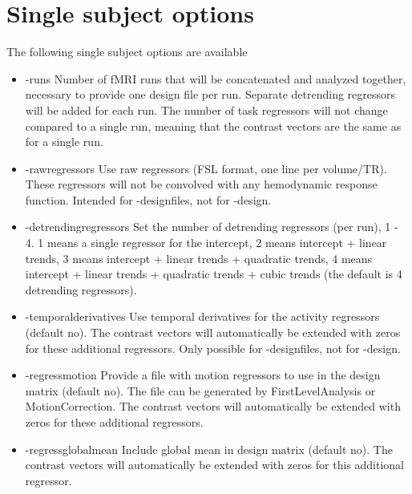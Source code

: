 \section{Single subject options}

The following single subject options are available

\begin{itemize}

\item -runs
\newline \newline Number of fMRI runs that will be concatenated and analyzed together, necessary to provide one design file per run. Separate detrending regressors will be added for each run. The number of task regressors will not change compared to a single run, meaning that the contrast vectors are the same as for a single run.

\item -rawregressors
\newline \newline Use raw regressors (FSL format, one line per volume/TR). These regressors will not be convolved with any hemodynamic response function. Intended for -designfiles, not for -design.

\item -detrendingregressors
\newline \newline Set the number of detrending regressors (per run), 1 - 4. 1 means a single regressor for the intercept, 2 means intercept + linear trends, 3 means intercept + linear trends + quadratic trends, 4 means intercept + linear trends + quadratic trends + cubic trends (the default is 4 detrending regressors).

\item -temporalderivatives
\newline \newline Use temporal derivatives for the activity regressors (default no). The contrast vectors will automatically be extended with zeros for these additional regressors. Only possible for -designfiles, not for -design.

\item -regressmotion
\newline \newline Provide a file with motion regressors to use in the design matrix (default no). The file can be generated by FirstLevelAnalysis or MotionCorrection. The contrast vectors will automatically be extended with zeros for these additional regressors.

\item -regressglobalmean
\newline \newline Include global mean in design matrix (default no). The contrast vectors will automatically be extended with zeros for this additional regressor.


\end{itemize}


